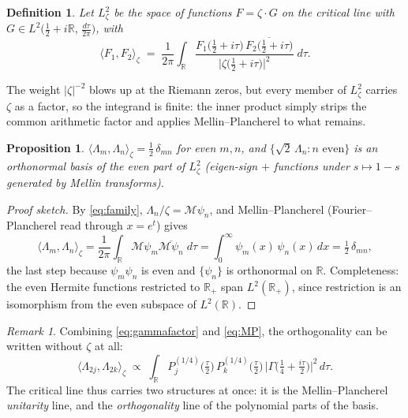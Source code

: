 \documentclass[11pt]{article}
\newtheorem{proposition}[theorem]{Proposition}
\newtheorem{definition}[theorem]{Definition}
\theoremstyle{remark}
\newtheorem{remark}[theorem]{Remark}
\newcommand{\R}{\mathbb{R}}
\newcommand{\M}{\mathcal{M}}
\begin{document}
\begin{definition}
Let $L^2_\zeta$ be the space of functions $F = \zeta \cdot G$ on the critical line with $G \in L^2\bigl(\tfrac12 + i\R,\, \tfrac{d\tau}{2\pi}\bigr)$, with
\begin{equation}
\langle F_1, F_2 \rangle_\zeta
\;=\; \frac{1}{2\pi} \int_\R
\frac{F_1\bigl(\tfrac12 + i\tau\bigr)\, \overline{F_2\bigl(\tfrac12 + i\tau\bigr)}}
{\bigl|\zeta\bigl(\tfrac12 + i\tau\bigr)\bigr|^2}\; d\tau .
\label{eq:innerproduct}
\end{equation}
\end{definition}

The weight $|\zeta|^{-2}$ blows up at the Riemann zeros, but every member of $L^2_\zeta$ carries $\zeta$ as a factor, so the integrand is finite: the inner product simply strips the common arithmetic factor and applies Mellin--Plancherel to what remains.

\begin{proposition}
$\langle \Lambda_m, \Lambda_n \rangle_\zeta = \tfrac12\, \delta_{mn}$ for even $m, n$, and $\{\sqrt{2}\,\Lambda_n : n \text{ even}\}$ is an orthonormal basis of the even part of $L^2_\zeta$ (eigen-sign $+$ functions under $s \mapsto 1-s$ generated by Mellin transforms).
\end{proposition}

\begin{proof}[Proof sketch]
By \eqref{eq:family}, $\Lambda_n / \zeta = \M\psi_n$, and Mellin--Plancherel (Fourier--Plancherel read through $x = e^t$) gives
\[
\langle \Lambda_m, \Lambda_n \rangle_\zeta
= \frac{1}{2\pi}\int_\R \M\psi_m \overline{\M\psi_n}\; d\tau
= \int_0^\infty \psi_m(x)\, \psi_n(x)\, dx
= \tfrac12\, \delta_{mn},
\]
the last step because $\psi_m \psi_n$ is even and $\{\psi_n\}$ is orthonormal on $\R$. Completeness: the even Hermite functions restricted to $\R_+$ span $L^2(\R_+)$, since restriction is an isomorphism from the even subspace of $L^2(\R)$.
\end{proof}

\begin{remark}
Combining \eqref{eq:gammafactor} and \eqref{eq:MP}, the orthogonality can be written without $\zeta$ at all:
\[
\langle \Lambda_{2j}, \Lambda_{2k} \rangle_\zeta
\;\propto\;
\int_\R P^{(1/4)}_j\bigl(\tfrac\tau2\bigr)\, P^{(1/4)}_k\bigl(\tfrac\tau2\bigr)\,
\bigl|\Gamma\bigl(\tfrac14 + \tfrac{i\tau}{2}\bigr)\bigr|^2\, d\tau .
\]
The critical line thus carries two structures at once: it is the Mellin--Plancherel \emph{unitarity} line, and the \emph{orthogonality} line of the polynomial parts of the basis.
\end{remark}
\end{document}
